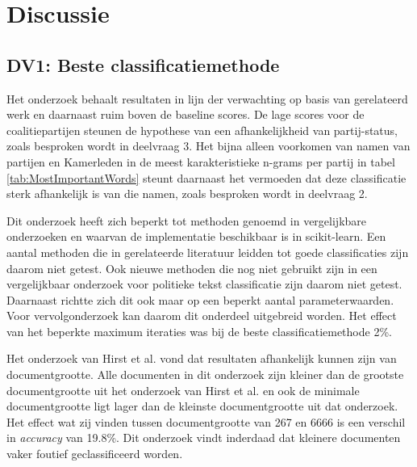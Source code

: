 \section{Discussie}
\subsection{DV1: Beste classificatiemethode}
Het onderzoek behaalt resultaten in lijn der verwachting op basis van gerelateerd werk en daarnaast ruim boven de baseline scores. De lage scores voor de coalitiepartijen steunen de hypothese van een afhankelijkheid van partij-status, zoals besproken wordt in deelvraag 3. Het bijna alleen voorkomen van namen van partijen en Kamerleden in de meest karakteristieke n-grams per partij in tabel \ref{tab:MostImportantWords} steunt daarnaast het vermoeden dat deze classificatie sterk afhankelijk is van die namen, zoals besproken wordt in deelvraag 2.\par
Dit onderzoek heeft zich beperkt tot methoden genoemd in vergelijkbare onderzoeken en waarvan de implementatie beschikbaar is in scikit-learn. Een aantal methoden die in gerelateerde literatuur leidden tot goede classificaties zijn daarom niet getest. Ook nieuwe methoden die nog niet gebruikt zijn in een vergelijkbaar onderzoek voor politieke tekst classificatie zijn daarom niet getest. Daarnaast richtte zich dit ook maar op een beperkt aantal parameterwaarden. Voor vervolgonderzoek kan daarom dit onderdeel uitgebreid worden. Het effect van het beperkte maximum iteraties was bij de beste classificatiemethode 2\%.\par
Het onderzoek van Hirst et al. vond dat resultaten afhankelijk kunnen zijn van documentgrootte. Alle documenten in dit onderzoek zijn kleiner dan de grootste documentgrootte uit het onderzoek van Hirst et al. en ook de minimale documentgrootte ligt lager dan de kleinste documentgrootte uit dat onderzoek.
Het effect wat zij vinden tussen documentgrootte van 267 en 6666 is een verschil in \textit{accuracy} van 19.8\%. Dit onderzoek vindt inderdaad dat kleinere documenten vaker foutief geclassificeerd worden.
